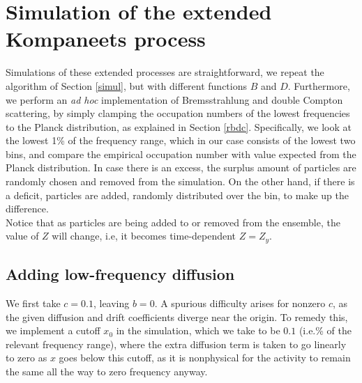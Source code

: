 \documentclass[a4paper,12pt,reqno,superscriptaddress,nofootinbib]{revtex4}
\newcommand{\0}{^{(0)}}
\newcommand{\1}{^{(1)}}
\newcommand{\2}{^{(2)}}
\begin{document}
\section{Simulation of the extended Kompaneets process}\label{simex}

Simulations of these extended processes are straightforward, we repeat the 
algorithm of Section \ref{simul}, but with different functions $B$ and $D$.  Furthermore, we perform an {\it ad hoc} implementation of Bremsstrahlung and double Compton scattering, by 
simply clamping the occupation numbers of the lowest frequencies to the Planck 
distribution, as explained in Section \ref{rbdc}. Specifically, we look at the 
lowest 1\% of the frequency range, which in our case consists of the lowest two 
bins, and compare the empirical occupation number with value expected from the 
Planck distribution. In case there is an excess, the surplus amount of particles 
are randomly chosen and removed from the simulation. On the other hand, if 
there is a deficit, particles are added, randomly distributed over the bin, to 
make up the difference.\\ 
Notice that as particles are being added to or removed from the ensemble, the 
value of $Z$ will change, i.e, it becomes time-dependent $Z=Z_y$.

\subsection{Adding low-frequency diffusion}

We first take $c = 0.1$, leaving $b=0$. A spurious difficulty arises for 
nonzero $c$, as the given diffusion and drift coefficients diverge near the 
origin. To remedy this, we implement a cutoff $x_0$ in the simulation, which we 
take to be $0.1$ (i.e.\% of the relevant frequency range), where the extra 
diffusion term is taken to go linearly to zero as $x$ goes below this cutoff, 
as it is nonphysical for the activity to remain the same all the way to zero 
frequency anyway.
\end{document}

